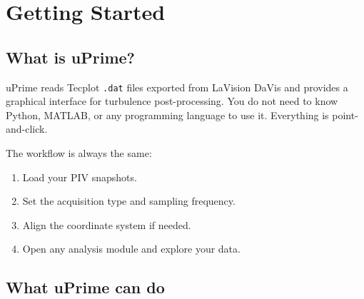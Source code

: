 \documentclass[11pt, a4paper]{report}
\newcommand{\software}[1]{\textsf{#1}}
\begin{document}
\tableofcontents
\clearpage

\chapter{Getting Started}

\section{What is uPrime?}

\software{uPrime} reads Tecplot \texttt{.dat} files exported from LaVision DaVis and provides a graphical interface for turbulence post-processing. You do not need to know Python, MATLAB, or any programming language to use it. Everything is point-and-click.

The workflow is always the same:
\begin{enumerate}[leftmargin=1.5em]
  \item Load your PIV snapshots.
  \item Set the acquisition type and sampling frequency.
  \item Align the coordinate system if needed.
  \item Open any analysis module and explore your data.
\end{enumerate}

\section{What uPrime can do}
\end{document}

